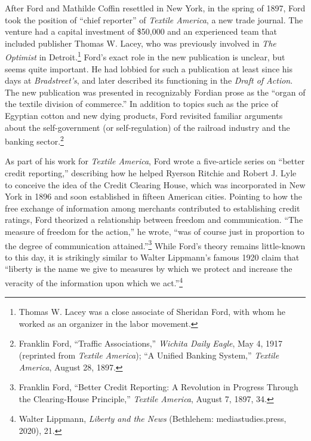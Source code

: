 \documentclass[twoside,symmetric,nobib,justified]{tufte-book}
\begin{document}
After Ford and Mathilde Coffin resettled in New York, in the spring of
1897, Ford took the position of ``chief reporter'' of \emph{Textile
America}, a new trade journal. The venture had a capital investment of
\$50,000 and an experienced team that included publisher Thomas W.
Lacey, who was previously involved in \emph{The Optimist} in
Detroit.\footnote{Thomas W. Lacey was a close associate of Sheridan
  Ford, with whom he worked as an organizer in the labor movement.}
Ford's exact role in the new publication is unclear, but seems quite
important. He had lobbied for such a publication at least since his days
at \emph{Bradstreet's}, and later described its functioning in the
\emph{Draft of Action}. The new publication was presented in
recognizably Fordian prose as the ``organ of the textile division of
commerce.'' In addition to topics such as the price of Egyptian cotton
and new dying products, Ford revisited familiar arguments about the
self-government (or self-regulation) of the railroad industry and the
banking sector.\footnote{Franklin Ford, ``Traffic Associations,''
  \emph{Wichita Daily Eagle}, May 4, 1917 (reprinted from \emph{Textile
  America}); ``A Unified Banking System,'' \emph{Textile America},
  August 28, 1897.}

As part of his work for \emph{Textile America}, Ford wrote a
five-article series on ``better credit reporting,'' describing how he
helped Ryerson Ritchie and Robert J. Lyle to conceive the idea of the
Credit Clearing House, which was incorporated in New York in 1896 and
soon established in fifteen American cities. Pointing to how the free
exchange of information among merchants contributed to establishing
credit ratings, Ford theorized a relationship between freedom and
communication. ``The measure of freedom for the action,'' he
wrote, ``was of course just in proportion to the degree of communication
attained.''\footnote{Franklin Ford, ``Better Credit Reporting: A
  Revolution in Progress Through the Clearing-House Principle,''
  \emph{Textile America}, August 7, 1897, 34.} While Ford's theory
remains little-known to this day, it is strikingly similar to Walter
Lippmann's famous 1920 claim that ``liberty is the name we give to
measures by which we protect and increase the veracity of the
information upon which we act.''\footnote{Walter Lippmann, \emph{Liberty
  and the News} (Bethlehem: mediastudies.press, 2020), 21.}

\enlargethispage{\baselineskip}
\end{document}

